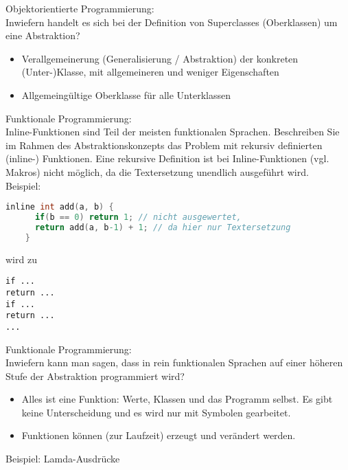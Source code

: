 \begin{card}
	Objektorientierte Programmierung:\\
	Inwiefern handelt es sich bei der Definition von Superclasses (Oberklassen) um eine Abstraktion?
	\hr
	\begin{itemize}
    \item Verallgemeinerung (Generalisierung / Abstraktion) der konkreten (Unter-)Klasse, mit allgemeineren und weniger Eigenschaften
	\item Allgemeingültige Oberklasse für alle Unterklassen
	\end{itemize}
\end{card}

\begin{card}
	Funktionale Programmierung:\\
	Inline-Funktionen sind Teil der meisten funktionalen Sprachen. Beschreiben Sie im Rahmen des Abstraktionskonzepts das Problem mit rekursiv definierten (inline-) Funktionen.
	\hr
	Eine rekursive Definition ist bei Inline-Funktionen (vgl. Makros) nicht möglich, da die Textersetzung unendlich ausgeführt wird.\\
	Beispiel:\\
	\begin{lstlisting}[language=C]
	inline int add(a, b) {
	  if(b == 0) return 1; // nicht ausgewertet,
	  return add(a, b-1) + 1; // da hier nur Textersetzung
	}
	\end{lstlisting}

	wird zu

  \begin{lstlisting}
if ...
return ...
if ...
return ...
...
  \end{lstlisting}

\end{card}

\begin{card}
	Funktionale Programmierung:\\
	Inwiefern kann man sagen, dass in rein funktionalen Sprachen auf einer höheren Stufe der Abstraktion programmiert wird?
	\hr
	\begin{itemize}
	\item Alles ist eine Funktion: Werte, Klassen und das Programm selbst. Es gibt keine Unterscheidung und es wird nur
	  mit Symbolen gearbeitet.
	\item Funktionen können (zur Laufzeit) erzeugt und verändert werden.

	\end{itemize}
	Beispiel: Lamda-Ausdrücke
\end{card}

